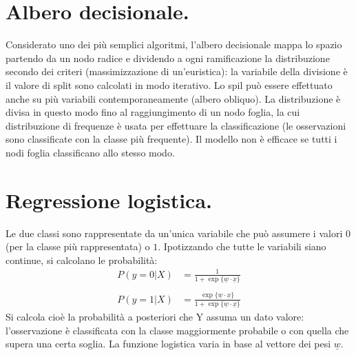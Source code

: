 \documentclass[11pt, a4page, twocolumn]{article}
\begin{document}
\section{Albero decisionale.}
Considerato uno dei più semplici algoritmi, l'albero decisionale mappa lo spazio partendo da un nodo radice e dividendo a ogni ramificazione la distribuzione secondo dei criteri (massimizzazione di un'euristica): la variabile della divisione è il valore di split sono calcolati in modo iterativo.
Lo spil può essere effettuato anche su più variabili contemporaneamente (albero obliquo).
La distribuzione è divisa in questo modo fino al raggiungimento di un nodo foglia, la cui distribuzione di frequenze è usata per effettuare la classificazione (le osservazioni sono classificate con la classe più frequente).
Il modello non è efficace se tutti i nodi foglia classificano allo stesso modo.


\section{Regressione logistica.}
Le due classi sono rappresentate da un'unica variabile che può assumere i valori $0$ (per la classe più rappresentata) o $1$.
Ipotizzando che tutte le variabili siano continue, si calcolano le probabilità:
\begin{align*}
P(y=0 | X) &= \frac{1}{1 + \exp{\{\underline{w} \cdot \underline{x}\}}} \\ \\
P(y=1 | X) &= \frac{\exp{\{\underline{w} \cdot \underline{x}\}}}{1 + \exp{\{\underline{w} \cdot \underline{x}\}}}
\end{align*}
Si calcola cioè la probabilità a posteriori che Y assuma un dato valore: l'osservazione è classificata con la classe maggiormente probabile o con quella che supera una certa soglia.
La funzione logistica varia in base al vettore dei pesi $\underline{w}$.
\end{document}
